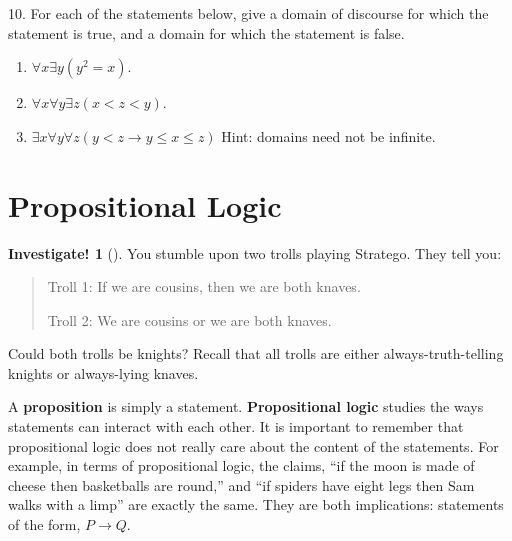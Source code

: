 \documentclass[10pt,]{book}
\newcommand{\terminology}[1]{\textbf{#1}}
\theoremstyle{plain}
\theoremstyle{definition}
\theoremstyle{definition}
\theoremstyle{definition}
\newtheorem{investigation}[project]{Investigate!}
\theoremstyle{definition}
\numberwithin{equation}{chapter}
\newcommand{\imp}{\rightarrow}
\newcommand{\lt}{<}
\begin{document}
\begin{exerciselist}
\par\smallskip
\item[10.]\hypertarget{exercise-134}{}\hypertarget{p-1160}{}%
For each of the statements below, give a domain of discourse for which the statement is true, and a domain for which the statement is false.%
\par
\hypertarget{p-1161}{}%
\leavevmode%
\begin{enumerate}[label=(\alph*)]
\item\hypertarget{li-595}{}\(\forall x \exists y (y^2 = x)\).%
\item\hypertarget{li-596}{}\(\forall x \forall y \exists z (x \lt  z \lt  y)\).%
\item\hypertarget{li-597}{}\(\exists x \forall y \forall z (y \lt  z \imp y \le x \le z)\) Hint: domains need not be infinite.%
\end{enumerate}
%
\par\smallskip
\end{exerciselist}
\typeout{************************************************}
\typeout{************************************************}
\section[{Propositional Logic}]{Propositional Logic}\label{sec_propositional}
\begin{investigation}[]\label{investigation-15}
\hypertarget{p-1166}{}%
You stumble upon two trolls playing Stratego\textregistered{}.  They tell you:%
\begin{quote}\hypertarget{blockquote-6}{}
\hypertarget{p-1167}{}%
Troll 1: If we are cousins, then we are both knaves.%
\par
\hypertarget{p-1168}{}%
Troll 2: We are cousins or we are both knaves.%
\end{quote}
\hypertarget{p-1169}{}%
Could both trolls be knights?  Recall that all trolls are either always-truth-telling knights or always-lying knaves.%
\end{investigation}
\hypertarget{p-1170}{}%
A \terminology{proposition} is simply a statement. \terminology{Propositional logic} studies the ways statements can interact with each other. It is important to remember that propositional logic does not really care about the content of the statements. For example, in terms of propositional logic, the claims, ``if the moon is made of cheese then basketballs are round,'' and ``if spiders have eight legs then Sam walks with a limp'' are exactly the same. They are both implications: statements of the form, \(P \imp Q\).%
\typeout{************************************************}
\typeout{************************************************}
\end{document}
